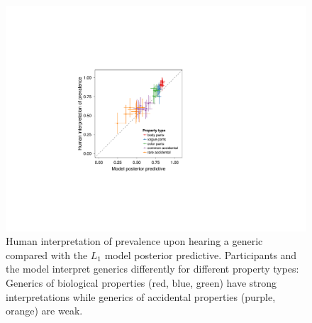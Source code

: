 \documentclass[12pt,letterpaper]{article}
\begin{document}
\begin{figure}
\centering
    \includegraphics[width=0.5\columnwidth]{implied-byItem-mh100kX2b.pdf}
    \caption{Human interpretation of prevalence upon hearing a generic compared with the $L_1$ model posterior predictive. 
    Participants and the model interpret generics differently for different property types: Generics of biological properties (red, blue, green) have  strong interpretations while generics of accidental properties (purple, orange) are weak.}
  \label{fig:impliedByItem}
\end{figure}
\end{document}

